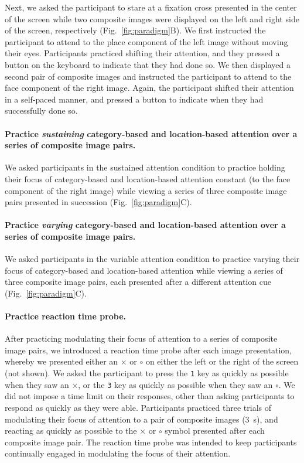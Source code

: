 \documentclass[english]{article}
\begin{document}
Next, we asked the participant to stare at a fixation cross presented in the
center of the screen while two composite images were displayed on the left and
right side of the screen, respectively (Fig.~\ref{fig:paradigm}B). We first
instructed the participant to attend to the place component of the left image
without moving their eyes. Participants practiced shifting their attention, and
they pressed a button on the keyboard to indicate that they had done so. We
then displayed a second pair of composite images and instructed the participant
to attend to the face component of the right image. Again, the participant
shifted their attention in a self-paced manner, and pressed a button to
indicate when they had successfully done so.

\paragraph{Practice \textit{sustaining} category-based and location-based attention over
a series of composite image pairs.}

We asked participants in the sustained attention condition to practice holding
their focus of category-based and location-based attention constant (to the
face component of the right image) while viewing a series of three composite
image pairs presented in succession (Fig.~\ref{fig:paradigm}C).

\paragraph{Practice \textit{varying} category-based and location-based
attention over a series of composite image pairs.}

We asked participants in the variable attention condition to practice varying
their focus of category-based and location-based attention while viewing a
series of three composite image pairs, each presented after a different
attention cue (Fig.~\ref{fig:paradigm}C).

\paragraph{Practice reaction time probe.}

After practicing modulating their focus of attention to a series of composite
image pairs, we introduced a reaction time probe after each image presentation,
whereby we presented either an $\times$ or $\circ$ on either the left or the
right of the screen (not shown). We asked the participant to press the
\texttt{1} key as quickly as possible when they saw an $\times$, or the
\texttt{3} key as quickly as possible when they saw an $\circ$. We did not
impose a time limit on their responses, other than asking participants to
respond as quickly as they were able. Participants practiced three trials of
modulating their focus of attention to a pair of composite images (3~s), and
reacting as quickly as possible to the $\times$ or $\circ$ symbol presented
after each composite image pair. The reaction time probe was intended to keep
participants continually engaged in modulating the focus of their attention.
\end{document}

